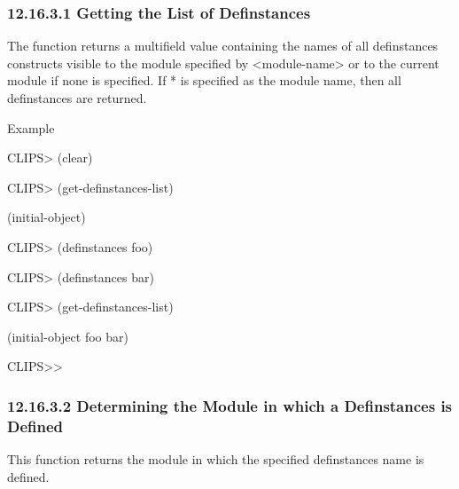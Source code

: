 \documentclass[letterpaper,10pt,english]{sphinxmanual}
\begin{document}
\subsubsection{12.16.3.1 Getting the List of Definstances}
\label{\detokenize{actions:getting-the-list-of-definstances}}
The function  returns a multifield value
containing the names of all definstances constructs visible to the
module specified by \textless{}module-name\textgreater{} or to the current module if none is
specified. If * is specified as the module name, then all definstances
are returned.


\begin{sphinxVerbatim}[commandchars=\\\{\}]
 \PYG{p}{[}\PYG{p}{]}
\end{sphinxVerbatim}

Example

CLIPS\textgreater{} (clear)

CLIPS\textgreater{} (get-definstances-list)

(initial-object)

CLIPS\textgreater{} (definstances foo)

CLIPS\textgreater{} (definstances bar)

CLIPS\textgreater{} (get-definstances-list)

(initial-object foo bar)

CLIPS\textgreater{}\textgreater{}


\subsubsection{12.16.3.2 Determining the Module in which a Definstances is Defined}
\label{\detokenize{actions:determining-the-module-in-which-a-definstances-is-defined}}
This function returns the module in which the specified definstances
name is defined.


\begin{sphinxVerbatim}[commandchars=\\\{\}]
 
\end{sphinxVerbatim}
\end{document}
